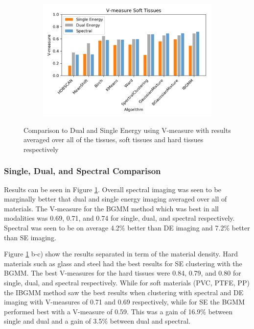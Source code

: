 \documentclass[a4paper,11pt]{article}
\begin{document}
\begin{figure}[b!]
\begin{subfigure}[b]{0.32\textwidth}
    \end{subfigure}
    \begin{subfigure}[b]{0.32\textwidth}
        \includegraphics[width=\textwidth]{figures/soft.png}
    \end{subfigure}
    \caption{Comparison to Dual and Single Energy using V-measure with results averaged over all of the tissues, soft tissues and hard tissues respectively}
    \label{results:hard_soft}
\end{figure}

\subsubsection{Single, Dual, and Spectral Comparison}

Results can be seen in Figure \ref{results:hard_soft}. Overall spectral imaging was seen to be marginally better that dual and single energy imaging averaged over all of materials. The V-measure for the BGMM method which was best in all modalities was 0.69, 0.71, and 0.74 for single, dual, and spectral respectively. Spectral was seen to be on average 4.2\% better than DE imaging and 7.2\% better than SE imaging.

Figure \ref{results:hard_soft} b-c) show the results separated in term of the material density. Hard materials such as glass and steel had the best results for SE clustering with the BGMM. The best V-measures for the hard tissues were 0.84, 0.79, and 0.80 for single, dual, and spectral respectively. While for soft materials (PVC, PTFE, PP) the IBGMM method saw the best results when clustering with spectral and DE imaging with V-measures of 0.71 and 0.69 respectively, while for SE the BGMM performed best with a V-measure of 0.59. This was a gain of 16.9\% between single and dual and a gain of 3.5\% between dual and spectral.
\end{document}
